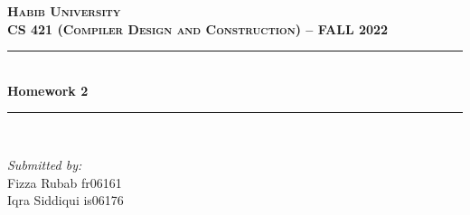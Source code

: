 \documentclass[12pt]{article}
\begin{document}
\begin{titlepage}

\newcommand{\HRule}{\rule{\linewidth}{0.5mm}} %

\center %
 

\textsc{\LARGE \textbf{Habib University}}\\[1.5cm] %
\textsc{\large \textbf{CS 421 (Compiler Design and Construction) – FALL 2022}}\\[0.5cm] %


\HRule \\[0.4cm]
{ \huge \bfseries Homework 2}\\[0.4cm] %
\HRule \\[1.5cm]
 

\begin{minipage}{0.4\textwidth}
\begin{center}
\emph{Submitted by:}\\ 
Fizza Rubab 	 fr06161	\\
Iqra Siddiqui			 is06176\\
\end{center}
\end{minipage}
~
\begin{minipage}{0.4\textwidth}
\end{minipage}\\[2cm]



\end{titlepage}
\end{document}
